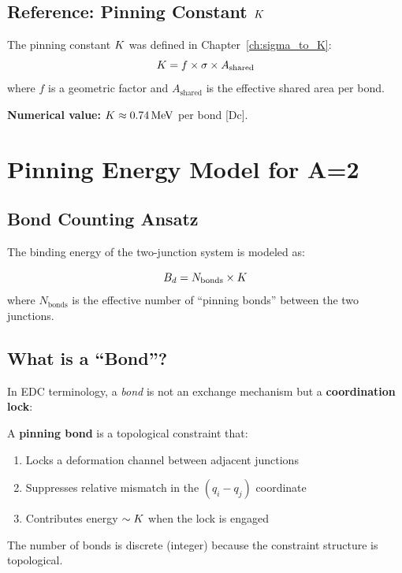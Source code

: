 \subsection{Reference: Pinning Constant $K$}

The pinning constant $K$ was defined in Chapter~\ref{ch:sigma_to_K}:
\begin{equation}
    K = f \times \sigma \times A_{\text{shared}}
    \label{eq:K_recall}
\end{equation}
where $f$ is a geometric factor and $A_{\text{shared}}$ is the effective
shared area per bond.

\textbf{Numerical value:} $K \approx 0.74\,\mathrm{MeV}$ per bond [Dc].

\section{Pinning Energy Model for A=2}
\label{sec:d:model}

\subsection{Bond Counting Ansatz}

The binding energy of the two-junction system is modeled as:

\begin{derivationbox}[title=Pinning Energy Model]
    \begin{equation}
        B_d = N_{\text{bonds}} \times K
        \label{eq:Bd_model}
    \end{equation}
    where $N_{\text{bonds}}$ is the effective number of ``pinning bonds''
    between the two junctions.
    \tagP
\end{derivationbox}

\subsection{What is a ``Bond''?}

In EDC terminology, a \emph{bond} is not an exchange mechanism but a
\textbf{coordination lock}:

\begin{definition}
    A \textbf{pinning bond} is a topological constraint that:
    \begin{enumerate}
        \item Locks a deformation channel between adjacent junctions
        \item Suppresses relative mismatch in the $(q_i - q_j)$ coordinate
        \item Contributes energy $\sim K$ when the lock is engaged
    \end{enumerate}
    The number of bonds is discrete (integer) because the constraint
    structure is topological.
    \tagDc
\end{definition}

